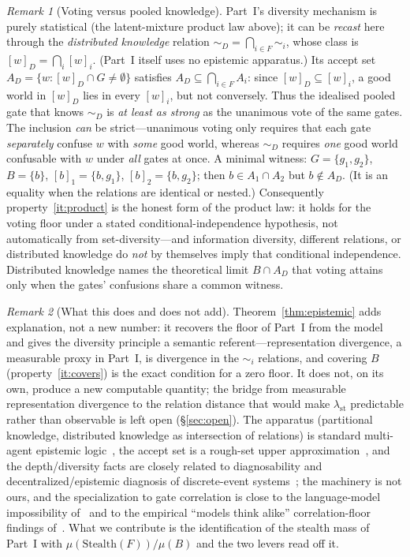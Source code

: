 \documentclass[11pt]{article}
\theoremstyle{definition}
\theoremstyle{remark}
\newtheorem{remark}{Remark}
\newcommand{\lst}{\lambda_{\mathrm{st}}}
\newcommand{\Stealth}{\mathrm{Stealth}}
\begin{document}
\begin{remark}[Voting versus pooled knowledge]\label{rem:pooled}
Part~I's diversity mechanism is purely statistical (the latent-mixture product law above); it can be
\emph{recast} here through the \emph{distributed knowledge} relation $\sim_D=\bigcap_{i\in F}\sim_i$,
whose class is $[w]_D=\bigcap_i[w]_i$. (Part~I itself uses no epistemic apparatus.) Its
accept set $A_D=\{w:[w]_D\cap G\neq\emptyset\}$ satisfies $A_D\subseteq\bigcap_{i\in F}A_i$: since
$[w]_D\subseteq[w]_i$, a good world in $[w]_D$ lies in every $[w]_i$, but not conversely. Thus the
idealised pooled gate that knows $\sim_D$ is \emph{at least as strong} as the unanimous vote of the
same gates. The inclusion \emph{can} be strict---unanimous voting only requires that each gate
\emph{separately} confuse $w$ with \emph{some} good world, whereas $\sim_D$ requires \emph{one} good
world confusable with $w$ under \emph{all} gates at once. A minimal witness: $G=\{g_1,g_2\}$,
$B=\{b\}$, $[b]_1=\{b,g_1\}$, $[b]_2=\{b,g_2\}$; then $b\in A_1\cap A_2$ but $b\notin A_D$. (It is an
equality when the relations are identical or nested.) Consequently property~\eqref{it:product} is the
honest form of the product law: it holds for the voting floor under a stated conditional-independence
hypothesis, not automatically from set-diversity---and information diversity, different relations, or
distributed knowledge do \emph{not} by themselves imply that conditional independence. Distributed
knowledge names the theoretical limit $B\cap A_D$ that voting attains only when the gates' confusions
share a common witness.
\end{remark}

\begin{remark}[What this does and does not add]\label{rem:epi-scope}
Theorem~\ref{thm:epistemic} adds explanation, not a new number: it recovers the floor of Part~I from
the model and gives the diversity principle a semantic referent---representation divergence, a
measurable proxy in Part~I, is divergence in the $\sim_i$ relations, and covering $B$
(property~\eqref{it:covers}) is the exact condition for a zero floor. It does not, on its own,
produce a new computable quantity; the bridge from measurable representation divergence to the
relation distance that would make $\lst$ predictable rather than observable is left open
(\S\ref{sec:open}). The apparatus (partitional knowledge, distributed knowledge as intersection of
relations) is standard multi-agent epistemic logic~\cite{fagin1995}, the accept set is a rough-set
upper approximation~\cite{pawlak1982}, and the depth/diversity facts are closely related to
diagnosability and decentralized/epistemic diagnosis of discrete-event
systems~\cite{sampath1995,debouk2000,descodiag2024}; the machinery is not ours, and the specialization to
gate correlation is close to the language-model impossibility of~\cite{masonanand2026} and to the
empirical ``models think alike'' correlation-floor findings of~\cite{goel2025,kim2025}. What we
contribute is the identification of the stealth mass of Part~I with $\mu(\Stealth(F))/\mu(B)$ and the
two levers read off it.
\end{remark}
\end{document}
